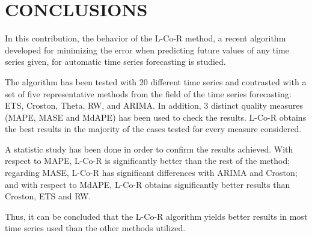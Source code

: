\documentclass[a4paper,twoside]{article}
\newcommand{\metodo}{L-Co-R}
\begin{document}
\section{\uppercase{Conclusions}} %
\label{sec:conclusions}

\noindent In this contribution, the behavior of the {\metodo} method, a recent algorithm developed for minimizing the error when predicting future values of any time series given, for automatic time series forecasting is studied. %

The algorithm has been tested with 20 different time series and%
contrasted with a set of five representative methods from the field of
the time series forecasting: ETS, Croston, Theta, RW, and ARIMA. In
addition, 3 distinct quality measures (MAPE, MASE and MdAPE) has been
used to check the results. {\metodo} obtains the best results in the
majority of the cases tested for every measure considered. %

A statistic study has been done in order to confirm the results achieved. %
With respect to MAPE, {\metodo} is significantly better than the rest
of the method; regarding MASE, {\metodo} has significant differences
with ARIMA and Croston; and with respect to MdAPE, {\metodo} obtains
significantly better results than Croston, ETS and RW. %

Thus, it can be concluded that the {\metodo} algorithm yields better
results in most time series used than the other methods utilized. %
\end{document}
